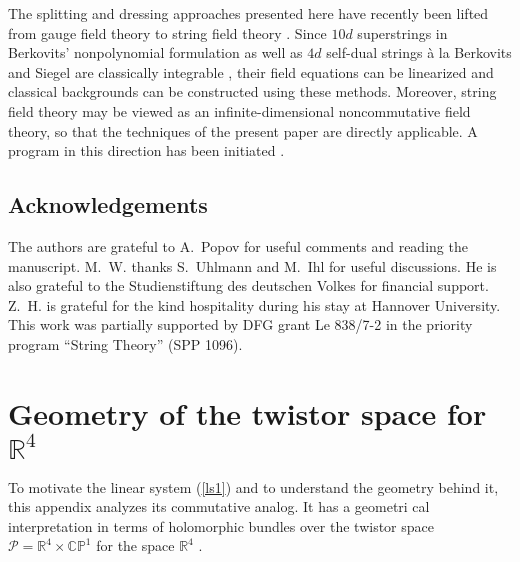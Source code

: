 \documentclass[a4paper,11pt,english]{article}
\numberwithin{equation}{section}
\renewcommand{\=}{\ =\ }
\begin{document}
The splitting and dressing approaches presented here have recently been
lifted from gauge field theory to string field theory 
\cite{Lechtenfeld:2002cu,Kling:2002ht}.
Since $10d$ superstrings in Berkovits' nonpolynomial formulation 
\cite{Berkovits:1995ab} 
as well as $4d$ self-dual strings \`a la Berkovits and Siegel
\cite{Berkovits:1997pq}
are classically integrable \cite{Lechtenfeld:2000qj},
their field equations can be linearized and classical backgrounds
can be constructed using these methods. 
Moreover, string field theory may be viewed as an infinite-dimensional
noncommutative field theory, so that the techniques of the present paper
are directly applicable. A program in this direction has been initiated
\cite{Lechtenfeld:2002cu,Kling:2002ht}.


\subsection*{Acknowledgements}

The authors are grateful to A.~Popov for useful comments and reading the 
manuscript. M.~W. thanks S.~Uhlmann and M.~Ihl for useful discussions. 
He is also grateful to the Studienstiftung des deutschen Volkes for
financial support. Z.~H. is grateful for the kind hospitality during his stay 
at Hannover University. This work was partially supported by DFG grant 
Le 838/7-2 in the priority program ``String Theory'' (SPP 1096).


\setcounter{section}{0}
\renewcommand{\thesection}{\Alph{section}}
\section{Geometry of the twistor space for $\mathbb{R}^4$}

To motivate the linear system (\ref{ls1}) and to understand the geometry %
behind it, this appendix analyzes its commutative analog. 
It has a geometri%
cal interpretation in terms of holomorphic bundles over the twistor space %
 $\mathcal{P}=\mathbb{R}^4\times\mathbb{CP}^1$ for the space $\mathbb{R%
}^4$ \cite{Atiyah:1977pw,WardWells}.%
\end{document}
